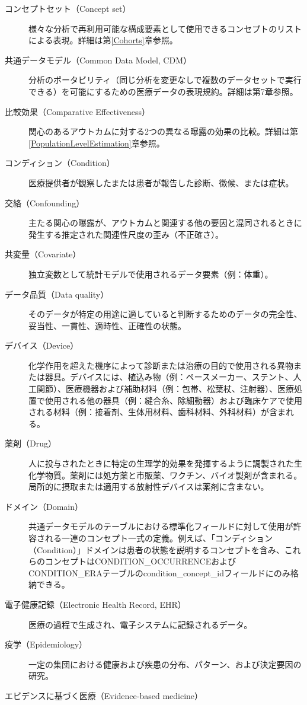 \documentclass[
  11pt]{book}
\theoremstyle{definition}
\theoremstyle{definition}
\theoremstyle{definition}
\theoremstyle{definition}
\theoremstyle{remark}
\begin{document}
\begin{description}
\item[コンセプトセット（Concept set）]
様々な分析で再利用可能な構成要素として使用できるコンセプトのリストによる表現。詳細は第\ref{Cohorts}章参照。
\item[共通データモデル（Common Data Model, CDM）]
分析のポータビリティ（同じ分析を変更なしで複数のデータセットで実行できる）を可能にするための医療データの表現規約。詳細は第7章参照。
\item[比較効果（Comparative Effectiveness）]
関心のあるアウトカムに対する2つの異なる曝露の効果の比較。詳細は第\ref{PopulationLevelEstimation}章参照。
\item[コンディション（Condition）]
医療提供者が観察したまたは患者が報告した診断、徴候、または症状。
\item[交絡（Confounding）]
主たる関心の曝露が、アウトカムと関連する他の要因と混同されるときに発生する推定された関連性尺度の歪み（不正確さ）。
\item[共変量（Covariate）]
独立変数として統計モデルで使用されるデータ要素（例：体重）。
\item[データ品質（Data quality）]
そのデータが特定の用途に適していると判断するためのデータの完全性、妥当性、一貫性、適時性、正確性の状態。
\item[デバイス（Device）]
化学作用を超えた機序によって診断または治療の目的で使用される異物または器具。デバイスには、植込み物（例：ペースメーカー、ステント、人工関節）、医療機器および補助材料（例：包帯、松葉杖、注射器）、医療処置で使用される他の器具（例：縫合糸、除細動器）および臨床ケアで使用される材料（例：接着剤、生体用材料、歯科材料、外科材料）が含まれる。
\item[薬剤（Drug）]
人に投与されたときに特定の生理学的効果を発揮するように調製された生化学物質。薬剤には処方薬と市販薬、ワクチン、バイオ製剤が含まれる。局所的に摂取または適用する放射性デバイスは薬剤に含まない。
\item[ドメイン（Domain）]
共通データモデルのテーブルにおける標準化フィールドに対して使用が許容される一連のコンセプト一式の定義。例えば、「コンディション（Condition）」ドメインは患者の状態を説明するコンセプトを含み、これらのコンセプトはCONDITION\_OCCURRENCEおよびCONDITION\_ERAテーブルのcondition\_concept\_idフィールドにのみ格納できる。
\item[電子健康記録（Electronic Health Record, EHR）]
医療の過程で生成され、電子システムに記録されるデータ。
\item[疫学（Epidemiology）]
一定の集団における健康および疾患の分布、パターン、および決定要因の研究。
\item[エビデンスに基づく医療（Evidence-based medicine）]

\end{description}
\end{document}
